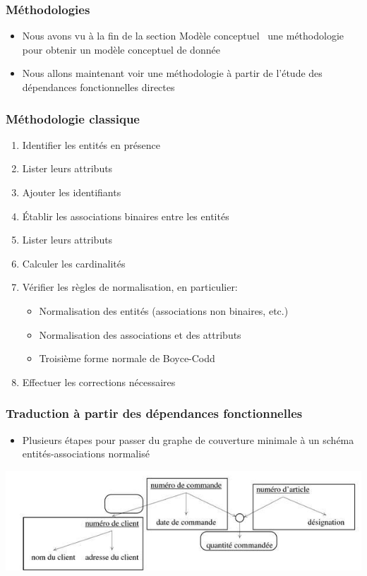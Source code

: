 \begin{frame}
  \frametitle{Méthodologies}
  \begin{itemize}
    \item Nous avons vu à la fin de la section \og Modèle conceptuel \fg\ une méthodologie pour obtenir un
      modèle conceptuel de donnée
    \item Nous allons maintenant voir une méthodologie à partir de l'étude des dépendances fonctionnelles
      directes
  \end{itemize}
\end{frame}

\begin{frame}
  \frametitle{Méthodologie classique}
  \begin{enumerate}
    \item Identifier les entités en présence
    \item Lister leurs attributs
    \item Ajouter les identifiants
    \item Établir les associations binaires entre les entités
    \item Lister leurs attributs
    \item Calculer les cardinalités
    \item Vérifier les règles de normalisation, en particulier:
      \begin{itemize}
        \item Normalisation des entités (associations non binaires, etc.)
        \item Normalisation des associations et des attributs
        \item Troisième forme normale de Boyce-Codd
      \end{itemize}
    \item Effectuer les corrections nécessaires
  \end{enumerate}
\end{frame}

\begin{frame}
  \frametitle{Traduction à partir des dépendances fonctionnelles}
  \begin{itemize}
    \item Plusieurs étapes pour passer du graphe de couverture minimale à un schéma entités-associations normalisé
  \end{itemize}
  \begin{center}
    \includegraphics[width=0.9\linewidth]{graphe_identifie_5.jpg}
  \end{center}
\end{frame}

